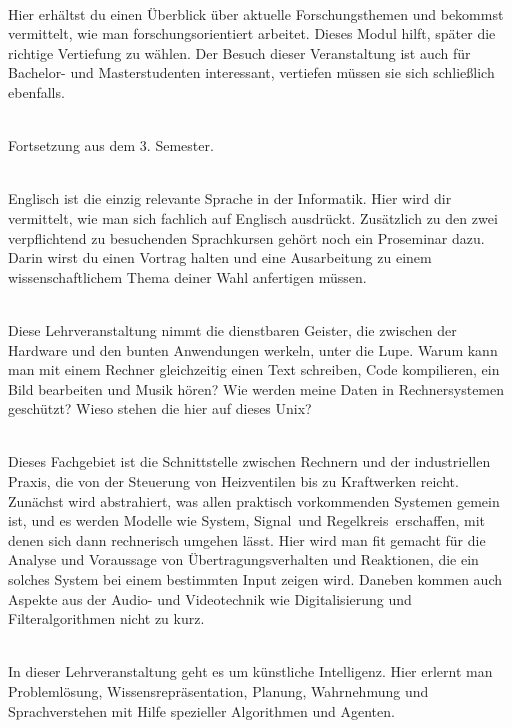 \textbf{} \\
Hier erhältst du einen Überblick über aktuelle Forschungsthemen und bekommst vermittelt, wie man forschungsorientiert arbeitet.
Dieses Modul hilft, später die richtige Vertiefung zu wählen. Der Besuch dieser Veranstaltung ist auch für Bachelor- und Masterstudenten interessant, vertiefen müssen sie sich schließlich ebenfalls.

\textbf{} \\
Fortsetzung aus dem 3. Semester.

\textbf{} \\
Englisch ist die einzig relevante Sprache in der Informatik.
Hier wird dir vermittelt, wie man sich fachlich auf Englisch ausdrückt. Zusätzlich zu den zwei verpflichtend zu besuchenden Sprachkursen gehört noch ein Proseminar dazu.
Darin wirst du einen Vortrag halten und eine Ausarbeitung zu einem wissenschaftlichem Thema deiner Wahl anfertigen müssen.


\textbf{} \\
Diese Lehrveranstaltung nimmt die dienstbaren Geister, die zwischen der Hardware und den bunten Anwendungen werkeln, unter die Lupe.
Warum kann man mit einem Rechner gleichzeitig einen Text schreiben, Code kompilieren, ein Bild bearbeiten und Musik hören?
Wie werden meine Daten in Rechnersystemen geschützt?
Wieso stehen die hier auf dieses Unix?

\textbf{} \\
Dieses Fachgebiet ist die Schnittstelle zwischen Rechnern und der industriellen Praxis, die von der Steuerung von Heizventilen bis zu Kraftwerken reicht.
Zunächst wird abstrahiert, was allen praktisch vorkommenden Systemen gemein ist, und es werden Modelle wie \glqq System\grqq, \glqq Signal\grqq\ und \glqq Regelkreis\grqq\ erschaffen, mit denen sich dann rechnerisch umgehen lässt.
Hier wird man fit gemacht für die Analyse und Voraussage von Übertragungsverhalten und Reaktionen, die ein solches System bei einem bestimmten Input zeigen wird.
Daneben kommen auch Aspekte aus der Audio- und Videotechnik wie Digitalisierung und Filteralgorithmen nicht zu kurz.

\textbf{} \\
In dieser Lehrveranstaltung geht es um künstliche Intelligenz.
Hier erlernt man Problemlösung, Wissensrepräsentation, Planung, Wahrnehmung und Sprachverstehen mit Hilfe spezieller Algorithmen und Agenten.

